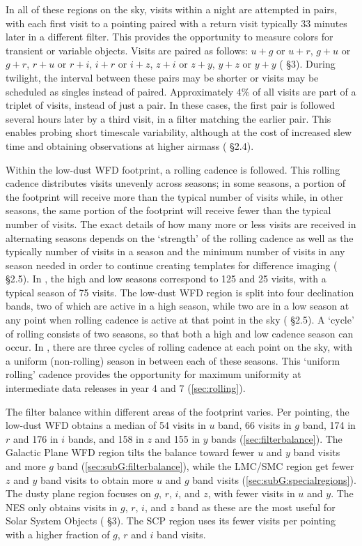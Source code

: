 In all of these regions on the sky, visits within a night are attempted in pairs, with each first visit to a pointing paired with a return visit typically 33 minutes later in a different filter. This provides the opportunity to measure colors for transient or variable objects. Visits are paired as follows: $u+g$ or $u+r$, $g+u$ or $g+r$, $r+u$ or $r+i$, $i+r$ or $i+z$, $z+i$ or $z+y$, $y+z$ or $y+y$ ( \S3).  During twilight, the interval between these pairs may be shorter or visits may be scheduled as singles instead of paired. Approximately 4\% of all visits are part of a triplet of visits, instead of just a pair. In these cases, the first pair is followed several hours later by a third visit, in a filter matching the earlier pair. This enables probing short timescale variability, although at the cost of increased slew time and obtaining observations at higher airmass ( \S2.4). 

Within the low-dust WFD footprint, a rolling cadence is followed. This rolling cadence distributes visits unevenly across seasons; in some seasons, a portion of the footprint will receive more than the typical number of visits while, in other seasons, the same portion of the footprint will receive fewer than the typical number of visits. The exact details of how many more or less visits are received in alternating seasons depends on the `strength' of the rolling cadence as well as the typically number of visits in a season and the minimum number of visits in any season needed in order to continue creating templates for difference imaging ( \S2.5). In , the high and low seasons correspond to 125 and 25 visits, with a typical season of 75 visits. The low-dust WFD region is split into four declination bands, two of which are active in a high season, while two are in a low season at any point when rolling cadence is active at that point in the sky ( \S2.5). A `cycle' of rolling consists of two seasons, so that both a high and low cadence season can occur. In , there are three cycles of rolling cadence at each point on the sky, with a uniform (non-rolling) season in between each of these seasons. This `uniform rolling' cadence provides the opportunity for maximum uniformity at intermediate data releases in year 4 and 7 (\autoref{sec:rolling}). 

The filter balance within different areas of the footprint varies. Per pointing, the low-dust WFD obtains a median of 54 visits in $u$ band, 66 visits in $g$ band, 174 in $r$ and 176 in $i$ bands, and 158 in $z$ and 155 in $y$ bands (\autoref{sec:filterbalance}). The Galactic Plane WFD region tilts the balance toward fewer $u$ and $y$ band visits and more $g$ band (\autoref{sec:subG:filterbalance}), while the LMC/SMC region get fewer $z$ and $y$ band visits to obtain more $u$ and $g$ band visits (\autoref{sec:subG:specialregions}). The dusty plane region focuses on $g$, $r$, $i$, and $z$, with fewer visits in $u$ and $y$. The NES only obtains visits in $g$, $r$, $i$, and $z$ band as these are the most useful for Solar System Objects ( \S3). The SCP region uses its fewer visits per pointing with a higher fraction of $g$, $r$ and $i$ band visits.


